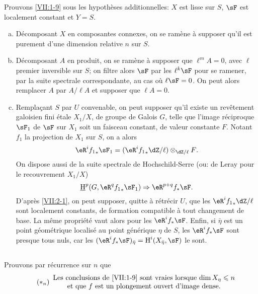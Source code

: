Prouvons \ref{VII:1-9} sous les hypoth\`eses additionnelles: $X$ est lisse sur 
$S$, $\sF$ est localement constant et $Y=S$. 
\begin{enumerate}[a)]
  \item D\'ecomposant $X$ en composantes connexes, on se ram\`ene \`a supposer 
    qu'il est purement d'une dimension relative $n$ sur $S$. 
  \item D\'ecomposant $A$ en produit, on se ram\`ene \`a supposer que 
    $\ell^m A=0$, avec $\ell$ premier inversible sur $S$; on filtre alors $\sF$ 
    par les $\ell^k \sF$ pour se ramener, par la suite spectrale 
    correspondante, au cas o\`u $\ell\sF=0$. On peut alors remplacer $A$ par 
    $A/\ell A$ et supposer que $\ell A=0$. 
  \item Remplaçant $S$ par $U$ convenable, on peut supposer qu'il existe un 
    rev\^etement galoisien fini \'etale $X_1/X$, de groupe de Galois $G$, telle 
    que l'image r\'eciproque $\sF_1$ de $\sF$ sur $X_1$ soit un faisceau 
    constant, de valeur constante $F$. Notant $f_1$ la projection de $X_1$ sur 
    $S$, on a alors 
    \[
      \eR^i {f_1}_\ast \sF_1 = (\eR^i {f_1}_\ast \dZ/\ell)\otimes_{\dZ/\ell} F \text{.} 
    \]
    On dispose aussi de la suite spectrale de Hochschild-Serre (ou: de Leray 
    pour le recouvrement $X_1/X$) 
    \[
      \underline\h^p(G,\eR^q {f_1}_\ast \sF_1) \Rightarrow \eR^{p+q} f_\ast \sF \text{.} 
    \]
    D'apr\`es \ref{VII:2-1}, on peut supposer, quitte \`a r\'etr\'ecir $U$, que 
    les $\eR^i {f_1}_\ast \dZ/\ell$ sont localement constants, de formation 
    compatible \`a tout changement de base. La m\^eme propri\'et\'e vaut alors 
    pour les $\eR^i f_\ast \sF$. Enfin, si $\bar\eta$ est un point 
    g\'eom\'etrique localis\'e au point g\'en\'erique $\eta$ de $S$, les 
    $\eR^i f_\ast\sF$ sont presque tous nuls, car les 
    $(\eR^i f_\ast \sF)_{\bar\eta} = \h^i(X_{\bar \eta},\sF)$ le sont. 
\end{enumerate}





\subsection{}\label{VII:2-3}

Prouvons par r\'ecurrence sur $n$ que 
\begin{equation*}\tag{$\ast_n$}\label{VII:eq:2-3-1}
  \begin{array}{c}
    \text{Les conclusions de \ref{VII:1-9} sont vraies lorsque $\dim{X_\eta}\leqslant n$} \\
    \text{et que $f$ est un plongement ouvert d'image dense.}
  \end{array}
\end{equation*}

